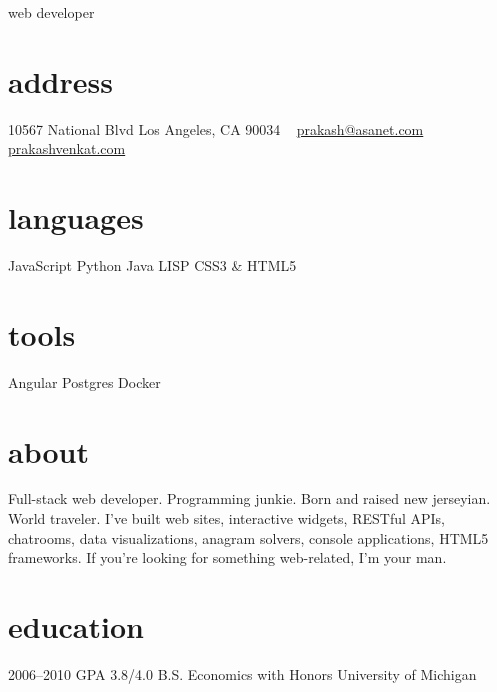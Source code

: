 \documentclass[]{friggeri-cv}
\begin{document}
%
%
       {web developer}%


\begin{aside}
  \section{address}
    10567 National Blvd
    Los Angeles, CA 90034
    ~
    \href{mailto:prakash@asanet.com}{prakash@asanet.com}
    \href{http://prakashvenkat.com}{prakashvenkat.com}
  \section{languages}
    JavaScript
    Python
    Java
    LISP
    CSS3 \& HTML5
  \section{tools}
    Angular
    Postgres
    Docker
\end{aside}

\section{about}
Full-stack web developer. Programming junkie. Born and raised new jerseyian. World traveler. I've built web sites, interactive widgets,
RESTful APIs, chatrooms, data visualizations, anagram solvers, console applications,
HTML5 frameworks. If you're looking for something web-related, I'm your man.

\section{education}

\begin{entrylist}
  \entry
    {2006–2010}
    {GPA 3.8/4.0}
    {B.S. Economics with Honors}
    {University of Michigan}
\end{entrylist}
\end{document}
